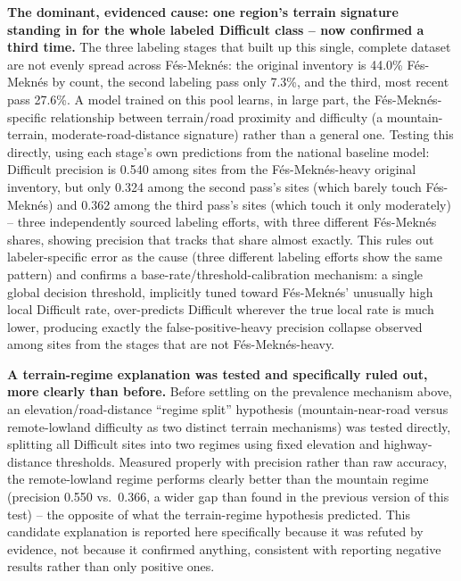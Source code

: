 \documentclass[11pt,a4paper]{article}
\begin{document}
\textbf{The dominant, evidenced cause: one region's terrain signature standing in for the whole labeled Difficult class -- now confirmed a third time.} The three labeling stages that built up this single, complete dataset are not evenly spread across Fés-Meknés: the original inventory is 44.0\% Fés-Meknés by count, the second labeling pass only 7.3\%, and the third, most recent pass 27.6\%. A model trained on this pool learns, in large part, the Fés-Meknés-specific relationship between terrain/road proximity and difficulty (a mountain-terrain, moderate-road-distance signature) rather than a general one. Testing this directly, using each stage's own predictions from the national baseline model: Difficult precision is 0.540 among sites from the Fés-Meknés-heavy original inventory, but only 0.324 among the second pass's sites (which barely touch Fés-Meknés) and 0.362 among the third pass's sites (which touch it only moderately) -- three independently sourced labeling efforts, with three different Fés-Meknés shares, showing precision that tracks that share almost exactly. This rules out labeler-specific error as the cause (three different labeling efforts show the same pattern) and confirms a base-rate/threshold-calibration mechanism: a single global decision threshold, implicitly tuned toward Fés-Meknés' unusually high local Difficult rate, over-predicts Difficult wherever the true local rate is much lower, producing exactly the false-positive-heavy precision collapse observed among sites from the stages that are not Fés-Meknés-heavy.

\textbf{A terrain-regime explanation was tested and specifically ruled out, more clearly than before.} Before settling on the prevalence mechanism above, an elevation/road-distance ``regime split'' hypothesis (mountain-near-road versus remote-lowland difficulty as two distinct terrain mechanisms) was tested directly, splitting all Difficult sites into two regimes using fixed elevation and highway-distance thresholds. Measured properly with precision rather than raw accuracy, the remote-lowland regime performs clearly better than the mountain regime (precision 0.550 vs.\ 0.366, a wider gap than found in the previous version of this test) -- the opposite of what the terrain-regime hypothesis predicted. This candidate explanation is reported here specifically because it was refuted by evidence, not because it confirmed anything, consistent with reporting negative results rather than only positive ones.
\end{document}
